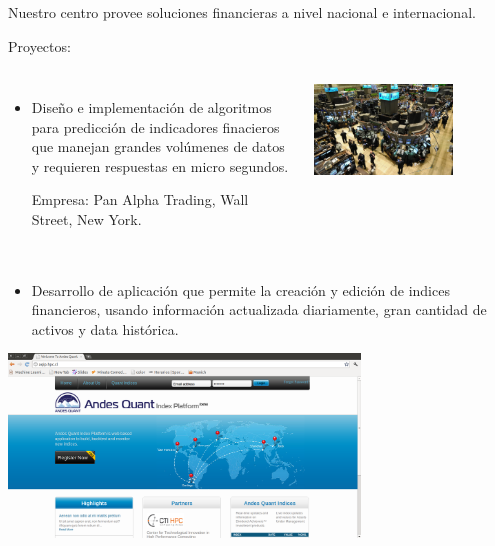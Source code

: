 \frame
{
\frametitle{}

Nuestro centro provee soluciones financieras a nivel nacional e internacional.

Proyectos:


\begin{columns}
\begin{itemize}
\item Diseño e implementación de algoritmos para predicción de indicadores finacieros que manejan grandes volúmenes de datos y requieren respuestas en micro segundos. 

Empresa: Pan Alpha Trading, Wall Street, New York.
\end{itemize}
\includegraphics[width=0.7\textwidth]{img/wallstreet}
\end{columns}

}

\frame
{
\frametitle{}

\begin{itemize}
\item Desarrollo de aplicación que permite la creación y edición de indices financieros, usando información actualizada diariamente, gran cantidad de activos y data histórica.
\end{itemize}
\begin{center}
 \includegraphics[width=0.7\textwidth]{img/ETF}
\end{center}





}


